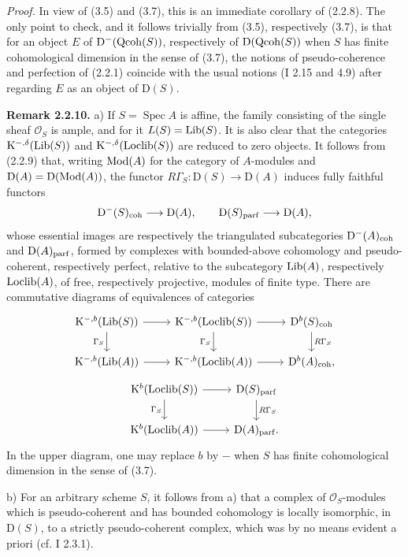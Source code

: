 \documentclass[11pt]{article}
\begin{document}
\emph{Proof.} In view of (3.5) and (3.7), this is an immediate corollary of (2.2.8). The only point to check, and it follows trivially from (3.5), respectively (3.7), is that for an object $E$ of $\mathrm D^{-}(\operatorname{Qcoh}(S))$, respectively of $\mathrm D(\operatorname{Qcoh}(S))$ when $S$ has finite cohomological dimension in the sense of (3.7), the notions of pseudo-coherence and perfection of (2.2.1) coincide with the usual notions (I 2.15 and 4.9) after regarding $E$ as an object of $\mathrm D(S)$.

\textbf{Remark 2.2.10.} a) If $S=\operatorname{Spec}A$ is affine, the family consisting of the single sheaf $\mathcal O_S$ is ample, and for it $L(S)=\operatorname{Lib}(S)$. It is also clear that the categories $\mathrm K^{-,\delta}(\operatorname{Lib}(S))$ and $\mathrm K^{-,\delta}(\operatorname{Loclib}(S))$ are reduced to zero objects. It follows from (2.2.9) that, writing $\operatorname{Mod}(A)$ for the category of $A$-modules and $\mathrm D(A)=\mathrm D(\operatorname{Mod}(A))$, the functor $R\Gamma_S:\mathrm D(S)\to\mathrm D(A)$ induces fully faithful functors
\[
\mathrm D^{-}(S)_{\mathrm{coh}}\longrightarrow \mathrm D(A),
\qquad
\mathrm D(S)_{\mathrm{parf}}\longrightarrow \mathrm D(A),
\]
whose essential images are respectively the triangulated subcategories $\mathrm D^{-}(A)_{\mathrm{coh}}$ and $\mathrm D(A)_{\mathrm{parf}}$, formed by complexes with bounded-above cohomology and pseudo-coherent, respectively perfect, relative to the subcategory $\operatorname{Lib}(A)$, respectively $\operatorname{Loclib}(A)$, of free, respectively projective, modules of finite type. There are commutative diagrams of equivalences of categories
\[
\begin{tikzcd}
\mathrm K^{-,b}(\Lib(S)) \arrow[r] \arrow[d,"\Gamma_S"'] &
\mathrm K^{-,b}(\Loclib(S)) \arrow[r] \arrow[d,"\Gamma_S"'] &
\mathrm D^b(S)_{\coh} \arrow[d,"R\Gamma_S"] \\
\mathrm K^{-,b}(\Lib(A)) \arrow[r] &
\mathrm K^{-,b}(\Loclib(A)) \arrow[r] &
\mathrm D^b(A)_{\coh},
\end{tikzcd}
\]
\[
\begin{tikzcd}
\mathrm K^b(\Loclib(S)) \arrow[r] \arrow[d,"\Gamma_S"'] &
\mathrm D(S)_{\parf} \arrow[d,"R\Gamma_S"] \\
\mathrm K^b(\Loclib(A)) \arrow[r] &
\mathrm D(A)_{\parf}.
\end{tikzcd}
\]
In the upper diagram, one may replace $b$ by $-$ when $S$ has finite cohomological dimension in the sense of (3.7).

b) For an arbitrary scheme $S$, it follows from a) that a complex of $\mathcal O_S$-modules which is pseudo-coherent and has bounded cohomology is locally isomorphic, in $\mathrm D(S)$, to a strictly pseudo-coherent complex, which was by no means evident a priori (cf. I 2.3.1).
\end{document}
